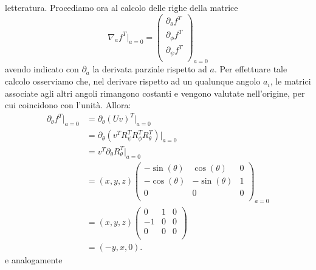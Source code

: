 \documentclass[fleqn,italian]{article}
\theoremstyle{definition}
\theoremstyle{remark}
\theoremstyle{plain}%
\theoremstyle{definition}
\theoremstyle{remark}
\numberwithin{equation}{section}
\numberwithin{thm}{section}
\begin{document}
letteratura.
Procediamo ora al calcolo delle righe della matrice
\begin{equation}
\nabla_a f^T\vert_{a=0}=\begin{pmatrix} \partial_\theta f^T \\
                             \partial_\phi f^T \\
                             \partial_\psi f^T \\
             \end{pmatrix}_{a=0}
\end{equation}
avendo indicato con $\partial_a$ la derivata parziale rispetto ad $a$. Per
effettuare tale calcolo osserviamo che, nel derivare rispetto ad un 
qualunque angolo $a_i$, le matrici associate agli altri angoli rimangono 
costanti e vengono valutate nell'origine, per cui coincidono con l'unit\`a. 
Allora:
\begin{equation}
\begin{split}
\partial_\theta f^T\vert_{a=0} &=\partial_\theta(Uv)^T\vert_{a=0} \\
          &= \partial_\theta(v^T R_\psi^T R_\phi^T R_\theta^T)\vert_{a=0} \\
          &= v^T \partial_\theta R_\theta^T\vert_{a=0} \\
          &= (x,y,z) \begin{pmatrix}  
                          -\sin(\theta) & \cos(\theta) & 0 \\
                          -\cos(\theta) & -\sin(\theta) & 1 \\
                           0 & 0 & 0 \\ \end{pmatrix}_{a=0} \\
          &= (x,y,z) \begin{pmatrix} 
                          0 & 1 & 0 \\-1 & 0 & 0 \\ 0 & 0 & 0 \\
                          \end{pmatrix} \\
          &= (-y,x,0).
\end{split}
\end{equation}
e analogamente
\end{document}
